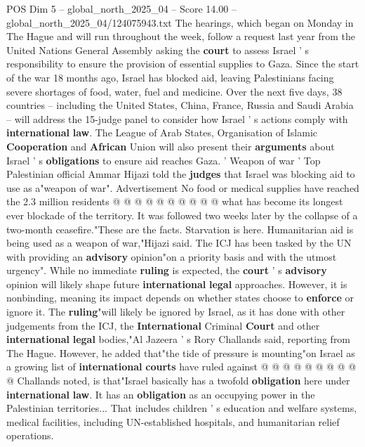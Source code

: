 \begin{textsample}{POS Dim 5 – global\_north\_2025\_04 – Score 14.00 – global\_north\_2025\_04/124075943.txt}  \label{ex:f5_pos_099}
The hearings, which began on Monday in The Hague and will run throughout the week, follow a request last year from the United Nations General Assembly asking the \textbf{court} to assess Israel ' s responsibility to ensure the provision of essential supplies to Gaza.
Since the start of the war 18 months ago, Israel has blocked aid, leaving Palestinians facing severe shortages of food, water, fuel and medicine.
Over the next five days, 38 countries -- including the United States, China, France, Russia and Saudi Arabia -- will address the 15-judge panel to consider how Israel ' s actions comply with \textbf{international} \textbf{law}.
The League of Arab States, Organisation of Islamic \textbf{Cooperation} and \textbf{African} Union will also present their \textbf{arguments} about Israel ' s \textbf{obligations} to ensure aid reaches Gaza. ' Weapon of war ' Top Palestinian official Ammar Hijazi told the \textbf{judges} that Israel was blocking aid to use as a"weapon of war".
Advertisement No food or medical supplies have reached the 2.3 million residents @ @ @ @ @ @ @ @ @ @ what has become its longest ever blockade of the territory.
It was followed two weeks later by the collapse of a two-month ceasefire."These are the facts.
Starvation is here.
Humanitarian aid is being used as a weapon of war,"Hijazi said.
The ICJ has been tasked by the UN with providing an \textbf{advisory} opinion"on a priority basis and with the utmost urgency".
While no immediate \textbf{ruling} is expected, the \textbf{court} ' s \textbf{advisory} opinion will likely shape future \textbf{international} \textbf{legal} approaches.
However, it is nonbinding, meaning its impact depends on whether states choose to \textbf{enforce} or ignore it.
The \textbf{ruling}"will likely be ignored by Israel, as it has done with other judgements from the ICJ, the \textbf{International} Criminal \textbf{Court} and other \textbf{international} \textbf{legal} bodies,"Al Jazeera ' s Rory Challands said, reporting from The Hague.
However, he added that"the tide of pressure is mounting"on Israel as a growing list of \textbf{international} \textbf{courts} have ruled against @ @ @ @ @ @ @ @ @ @ Challands noted, is that"Israel basically has a twofold \textbf{obligation} here under \textbf{international} \textbf{law}.
It has an \textbf{obligation} as an occupying power in the Palestinian territories...
That includes children ' s education and welfare systems, medical facilities, including UN-established hospitals, and humanitarian relief operations.

\end{textsample}
